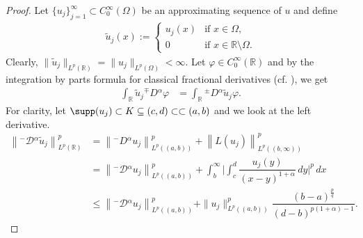 \documentclass[leqno,final]{siamltex}
\numberwithin{equation}{section}
\renewcommand{\(}{\bigl(}
\renewcommand{\)}{\bigr)}
\newcommand{\R}{\mathbb{R}}
\begin{document}
    \begin{proof}
        Let $\{u_j\}_{j = 1}^{\infty}  \subset C^{\infty}_{0}(\Omega)$ be an approximating sequence of $u$ and define
        \begin{align*}
            \tilde{u}_j(x):= \begin{cases}
             u_j(x) &\text{if } x\in \Omega, \\ 
             0 &\text{if } x \in \R \setminus \Omega .
             \end{cases}
         \end{align*}
         Clearly, $\|\tilde{u}_j\|_{L^{p}(\R)} = \|u_j\|_{L^{p}(\Omega)} <\infty$. Let $\varphi \in C^{\infty}_{0}(\R)$ and by the integration by parts formula for classical fractional derivatives (cf. \cite[Theorem 2.5]{Feng_Sutton}), we get 
        \begin{align*}
            \int_{\R} \tilde{u}_j {^{\mp}}{D}{^{\alpha}}\varphi  &= \int_{\R} {^{\pm}}{D}{^{\alpha}} \tilde{u}_j \varphi .
        \end{align*}
        For clarity, let $\supp(u_j) \subset K\subseteq (c,d) \subset\subset (a,b)$ and we look at the left derivative.
        \begin{align*}
            \left\|{^{-}}{\mathcal{D}}{^{\alpha}} \tilde{u}_j \right\|_{L^{p}(\R)}^{p} 
            &= \left\| {^{-}}{D}{^{\alpha}} u_j \right\|_{L^{p}((a,b))}^{p} + \left\|L(u_j)\right\|_{L^{p}((b,\infty))}^{p} \\ 
            &= \left\|{^{-}}{\mathcal{D}}{^{\alpha}}u_j \right\|_{L^{p}((a,b))}^{p} + \int_{b}^{\infty} \biggl| \int_{c}^{d} \dfrac{u_j(y)}{(x-y)^{1+\alpha}} \,dy \biggr|^{p}\,dx \\ 
            &\leq \left\|{^{-}}{\mathcal{D}}{^{\alpha}}u_j \right\|_{L^{p}((a,b))}^{p} + \|u_j\|_{L^{p}((a,b))}^{p}\dfrac{(b-a)^{\frac{p}{q}}}{(d-b)^{p(1+\alpha) - 1}}.

\end{align*}
\end{proof}
\end{document}
